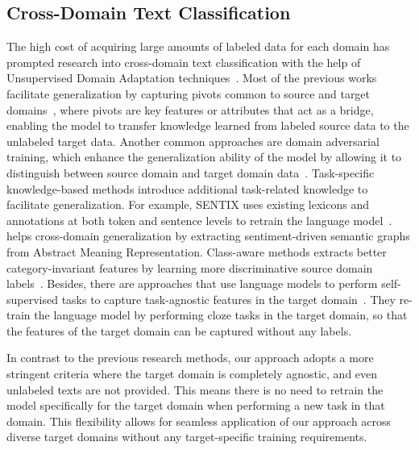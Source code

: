 \documentclass[letterpaper]{article} %
\begin{document}
\subsection{Cross-Domain Text Classification}
The high cost of acquiring large amounts of labeled data for each domain has prompted research into cross-domain text classification with the help of Unsupervised Domain Adaptation techniques~\cite{BlitzerDP07, YuJ16, RamponiP20}. Most of the previous works facilitate generalization by capturing pivots common to source and target domains~\cite{LiWZY18, ZiserR18, ZhangHPJ18, Ben-DavidRR20}, where pivots are key features or attributes that act as a bridge, enabling the model to transfer knowledge learned from labeled source data to the unlabeled target data. Another common approaches are domain adversarial training, which enhance the generalization ability of the model by allowing it to distinguish between source domain and target domain data~\cite{GaninUAGLLML16, QuZC0Z19, WuS22}. Task-specific knowledge-based methods introduce additional task-related knowledge to facilitate generalization. For example, SENTIX uses existing lexicons and annotations at both token and sentence levels to retrain the language model~\cite{ZhouTWWXH20}. \cite{LiWJZ22} helps cross-domain generalization by extracting sentiment-driven semantic graphs from Abstract Meaning Representation. Class-aware methods extracts better category-invariant features by learning more discriminative source domain labels~\cite{YeTHLNB20, LuoGL022}. Besides, there are approaches that use language models to perform self-supervised tasks to capture task-agnostic features in the target domain~\cite{DuSWQL20, KarouzosPP21}. They re-train the language model by performing cloze tasks in the target domain, so that the features of the target domain can be captured without any labels.

In contrast to the previous research methods, our approach adopts a more stringent criteria where the target domain is completely agnostic, and even unlabeled texts are not provided. This means there is no need to retrain the model specifically for the target domain when performing a new task in that domain. This flexibility allows for seamless application of our approach across diverse target domains without any target-specific training requirements.
\end{document}
